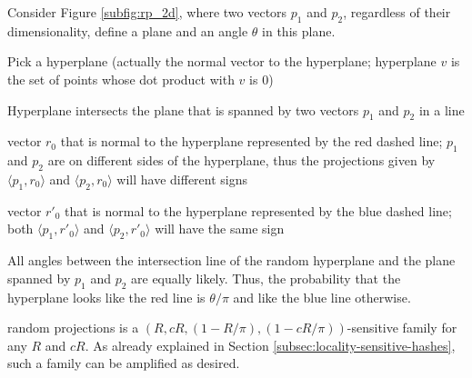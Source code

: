 Consider Figure \ref{subfig:rp_2d}, where two vectors $p_1$ and $p_2$, regardless of their dimensionality, define a plane and an angle $\theta$ in this plane.

Pick a hyperplane (actually the normal vector to the hyperplane; hyperplane $v$ is the set of points whose dot product with $v$ is 0)

Hyperplane intersects the plane that is spanned by two vectors $p_1$ and $p_2$ in a line

vector $r_0$ that is normal to the hyperplane represented by the red dashed line; $p_1$ and $p_2$ are on different sides of the hyperplane, thus the projections given by $\langle p_1, r_0 \rangle$ and  $\langle p_2, r_0 \rangle$ will have different signs

vector $r'_0$ that is normal to the hyperplane represented by the blue dashed line;  both $\langle p_1, r'_0 \rangle$ and  $\langle p_2, r'_0 \rangle$ will have the same sign

All angles between the intersection line of the random hyperplane and the plane spanned by $p_1$ and $p_2$ are equally likely. Thus, the probability that the hyperplane looks like the red line is $\theta / \pi$ and like the blue line otherwise.

random projections is a $(R, cR, (1-R/\pi), (1-cR/\pi))$-sensitive family for any $R$ and $cR$. As already explained in Section \ref{subsec:locality-sensitive-hashes}, such a family can be amplified as desired.